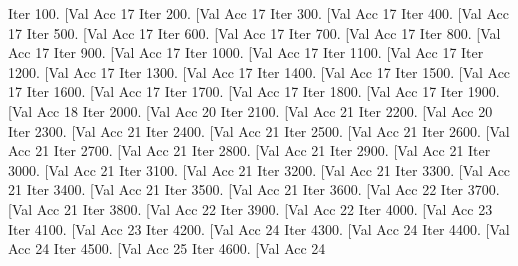 \documentclass[12pt]{article}
\begin{document}
\begin{python}
Iter 100. [Val Acc 17%
Iter 200. [Val Acc 17%
Iter 300. [Val Acc 17%
Iter 400. [Val Acc 17%
Iter 500. [Val Acc 17%
Iter 600. [Val Acc 17%
Iter 700. [Val Acc 17%
Iter 800. [Val Acc 17%
Iter 900. [Val Acc 17%
Iter 1000. [Val Acc 17%
Iter 1100. [Val Acc 17%
Iter 1200. [Val Acc 17%
Iter 1300. [Val Acc 17%
Iter 1400. [Val Acc 17%
Iter 1500. [Val Acc 17%
Iter 1600. [Val Acc 17%
Iter 1700. [Val Acc 17%
Iter 1800. [Val Acc 17%
Iter 1900. [Val Acc 18%
Iter 2000. [Val Acc 20%
Iter 2100. [Val Acc 21%
Iter 2200. [Val Acc 20%
Iter 2300. [Val Acc 21%
Iter 2400. [Val Acc 21%
Iter 2500. [Val Acc 21%
Iter 2600. [Val Acc 21%
Iter 2700. [Val Acc 21%
Iter 2800. [Val Acc 21%
Iter 2900. [Val Acc 21%
Iter 3000. [Val Acc 21%
Iter 3100. [Val Acc 21%
Iter 3200. [Val Acc 21%
Iter 3300. [Val Acc 21%
Iter 3400. [Val Acc 21%
Iter 3500. [Val Acc 21%
Iter 3600. [Val Acc 22%
Iter 3700. [Val Acc 21%
Iter 3800. [Val Acc 22%
Iter 3900. [Val Acc 22%
Iter 4000. [Val Acc 23%
Iter 4100. [Val Acc 23%
Iter 4200. [Val Acc 24%
Iter 4300. [Val Acc 24%
Iter 4400. [Val Acc 24%
Iter 4500. [Val Acc 25%
Iter 4600. [Val Acc 24%

\end{python}
\end{document}
